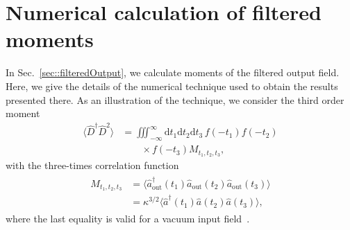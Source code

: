 \documentclass[pra,twocolumn,superscriptaddress]{revtex4-1}
\newcommand{\ah}[0]{\hat{a}}
\newcommand{\aout}[0]{\hat{a}_{\mathrm{out}}}
\newcommand{\drm}[0]{\mathrm{d}}
\begin{document}
\section{Numerical calculation of filtered moments}	\label{app::filteredMoments}
In Sec.~\ref{sec::filteredOutput}, we calculate moments of the filtered output field. Here, we give the details of the numerical technique used to obtain the results presented there. As an illustration of the technique, we consider the third order moment
\begin{equation}
	\begin{split}
	\langle \hat D^\dag \hat D^2 \rangle  &= 
	\iiint_{-\infty}^{\infty} \drm t_1 \drm t_2 \drm t_3 \, f(-t_1)f(-t_2)
	\\ &\qquad\times
	f(-t_3) 
		M_{t_1,t_2,t_3} ,
	\end{split}
\end{equation}
with the three-times correlation function
\begin{align}
\begin{split}
	M_{t_1,t_2,t_3} &=\langle \aout^\dag(t_1)\aout(t_2)\aout(t_3) \rangle
	\\
	&=
	\kappa^{3/2}\langle \ah^\dag(t_1)\ah(t_2)\ah(t_3) \rangle,
\end{split}
\end{align}
where the last equality is valid for a vacuum input field~\cite{Gardiner:1985ly}.
\end{document}
